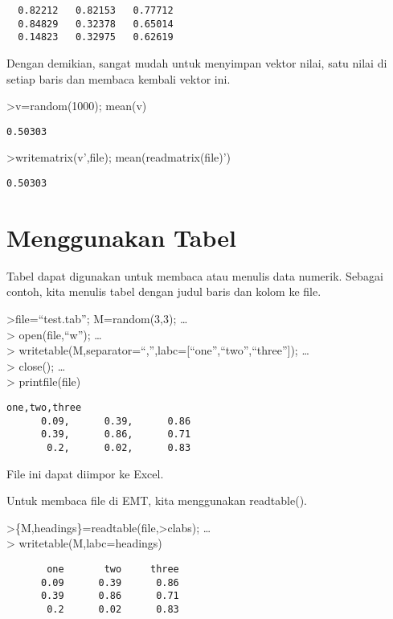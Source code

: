 \documentclass[
]{book}
\begin{document}
\begin{verbatim}
  0.82212   0.82153   0.77712 
  0.84829   0.32378   0.65014 
  0.14823   0.32975   0.62619 
\end{verbatim}

Dengan demikian, sangat mudah untuk menyimpan vektor nilai, satu nilai di setiap baris dan membaca kembali vektor ini.

\textgreater v=random(1000); mean(v)

\begin{verbatim}
0.50303
\end{verbatim}

\textgreater writematrix(v',file); mean(readmatrix(file)')

\begin{verbatim}
0.50303
\end{verbatim}

\chapter{Menggunakan Tabel}\label{menggunakan-tabel}

Tabel dapat digunakan untuk membaca atau menulis data numerik. Sebagai contoh, kita menulis tabel dengan judul baris dan kolom ke file.

\textgreater file=``test.tab''; M=random(3,3); \ldots{}\\
\textgreater{} open(file,``w''); \ldots{}\\
\textgreater{} writetable(M,separator=``,'',labc={[}``one'',``two'',``three''{]}); \ldots{}\\
\textgreater{} close(); \ldots{}\\
\textgreater{} printfile(file)

\begin{verbatim}
one,two,three
      0.09,      0.39,      0.86
      0.39,      0.86,      0.71
       0.2,      0.02,      0.83
\end{verbatim}

File ini dapat diimpor ke Excel.

Untuk membaca file di EMT, kita menggunakan readtable().

\textgreater\{M,headings\}=readtable(file,\textgreater clabs); \ldots{}\\
\textgreater{} writetable(M,labc=headings)

\begin{verbatim}
       one       two     three
      0.09      0.39      0.86
      0.39      0.86      0.71
       0.2      0.02      0.83
\end{verbatim}
\end{document}
